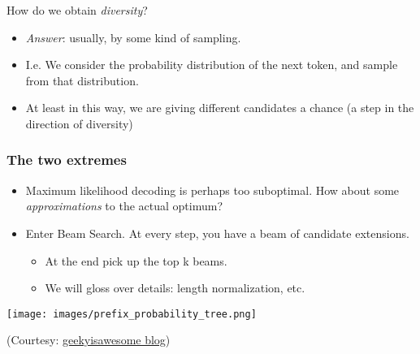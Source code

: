 \documentclass[11pt]{beamer}
\begin{document}
\begin{frame}
  How do we obtain {\em diversity}?
\begin{itemize}
  \item
  {\em Answer}: usually, by some kind of sampling.
\item
  I.e. We consider the probability distribution of the next token, and sample from that
  distribution.
\item
  At least in this way, we are giving different candidates a chance (a step
  in the direction of diversity)
\end{itemize}
\end{frame}

\begin{frame}
  \frametitle{The two extremes}
  \begin{itemize}
    \item Maximum likelihood decoding is perhaps too suboptimal. How about some
    {\em approximations} to the actual optimum?
    \item Enter Beam Search. At every step, you have a beam of candidate extensions.
    \begin{itemize}
    \item At the
    end pick up the top k beams.
    \item We will gloss over details: length normalization, etc.
    \end{itemize}
\end{itemize}
\end{frame}

\begin{frame}
\begin{center}
\texttt{[image: images/prefix\_probability\_tree.png]}
\end{center}
(Courtesy: \href{https://geekyisawesome.blogspot.com/2016/10/using-beam-search-to-generate-most.html}{geekyisawesome blog})
\end{frame}
\end{document}

